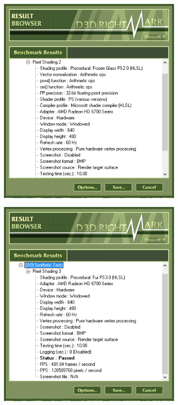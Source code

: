 \documentclass[
	a4paper,
	oneside,
	BCOR = 10mm,
	DIV = 12,
	12pt,
	headings = normal,
]{scrartcl}
\begin{document}
\begin{figure}[!htbp]
\begin{subfigure}[t]{\columnwidth / 2}
					\caption{}
					\label{subfig:d3drightmark-pxshading-01-res}
				\end{subfigure}
				\begin{subfigure}[t]{\columnwidth / 2}
					\centering
					\includegraphics[height=10\baselineskip]{./assets/y03s02-pcdiag-lab-04-p04-04-d3drightmark-pxshading-02-res.png}
					\caption{}
					\label{subfig:d3drightmark-pxshading-02-res}
				\end{subfigure}%
				\begin{subfigure}[t]{\columnwidth / 2}
					\centering
					\includegraphics[height=10\baselineskip]{./assets/y03s02-pcdiag-lab-04-p04-05-d3drightmark-pxshading-03-res.png}

\end{subfigure}
\end{figure}
\end{document}
